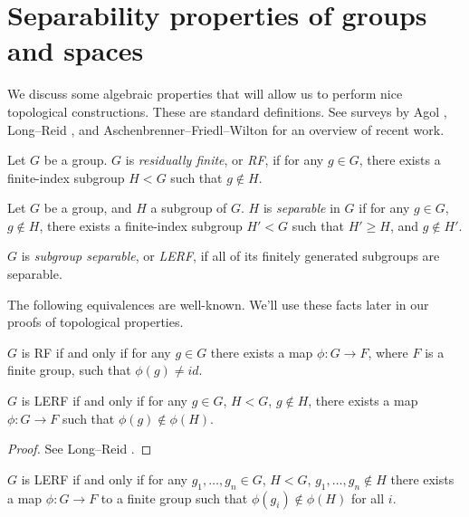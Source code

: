 \section{Separability properties of groups and spaces}

We discuss some algebraic properties that will allow us to perform nice
topological constructions. These are standard definitions. See surveys by Agol
\cite{Agolsurvey}, Long--Reid \cite{LR}, and Aschenbrenner--Friedl--Wilton
\cite{AFW} for an overview of recent work.

\begin{defn}

Let $G$ be a group. $G$ is \emph{residually finite}, or \emph{RF}, if for any
$g \in G$, there exists a finite-index subgroup $H<G$ such that $g \notin H$.

Let $G$ be a group, and $H$ a subgroup of $G$. $H$ is \emph{separable} in $G$
if for any $g \in G$, $g \notin H$, there exists a finite-index subgroup $H'<G$
such that $H' \geq H$, and $g \notin H'$.

$G$ is \emph{subgroup separable}, or \emph{LERF}, if all of its finitely
generated subgroups are separable.

\end{defn}

The following equivalences are well-known.  We'll use these facts later in our
proofs of topological properties.

\begin{prop}\label{P:lerfmap}

$G$ is RF if and only if for any $g \in G$ there exists a map $\phi \colon
G \to F$, where $F$ is a finite group, such that $\phi(g) \neq id$.

$G$ is LERF if and only if for any $g \in G$, $H < G$, $g \notin H$, there
exists a map $\phi \colon G \to F$ such that $\phi(g) \notin \phi(H)$.

\end{prop}

\begin{proof}

See Long--Reid \cite[pp17]{LR}.

\end{proof}

\begin{cor}\label{C:lerfmap'}

$G$ is LERF if and only if for any $g_1,\dots,g_n \in G$, $H<G$, $g_1,\dots,g_n
\notin H$ there exists a map $\phi \colon G \to F$ to a finite group such that
$\phi(g_i) \notin \phi(H)$ for all $i$.

\end{cor}

